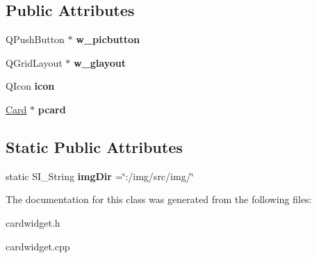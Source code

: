 \subsection*{Public Attributes}
\begin{DoxyCompactItemize}
\item 
\mbox{\label{class_card_widget_a8466130e2bf6f2db76bf6c42061036c3}} 
Q\+Push\+Button $\ast$ {\bfseries w\+\_\+picbutton}
\item 
\mbox{\label{class_card_widget_a500a89ece7e911444b632b76786820b3}} 
Q\+Grid\+Layout $\ast$ {\bfseries w\+\_\+glayout}
\item 
\mbox{\label{class_card_widget_a47ebad10252a186182dddc8bb4a59314}} 
Q\+Icon {\bfseries icon}
\item 
\mbox{\label{class_card_widget_a39d4de66056548aba91ac9b1925ae191}} 
\hyperlink{class_card}{Card} $\ast$ {\bfseries pcard}
\end{DoxyCompactItemize}
\subsection*{Static Public Attributes}
\begin{DoxyCompactItemize}
\item 
\mbox{\label{class_card_widget_a9cc2464f7d43b18f6b5d5a4e2363edaa}} 
static S\+I\+\_\+\+String {\bfseries img\+Dir} =\char`\"{}\+:/img/src/img/\char`\"{}
\end{DoxyCompactItemize}


The documentation for this class was generated from the following files\+:\begin{DoxyCompactItemize}
\item 
cardwidget.\+h\item 
cardwidget.\+cpp\end{DoxyCompactItemize}
